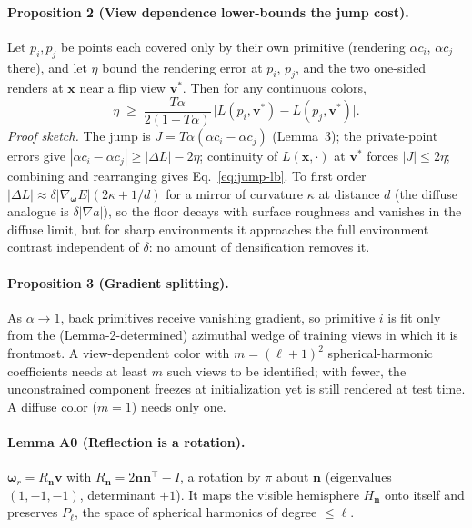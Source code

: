 \paragraph{Proposition 2 (View dependence lower-bounds the jump cost).} Let $p_i,p_j$ be points
each covered only by their own primitive (rendering $\alpha c_i$, $\alpha c_j$ there), and let $\eta$
bound the rendering error at $p_i$, $p_j$, and the two one-sided renders at $\mathbf{x}$ near a
flip view $\mathbf{v}^*$. Then for any continuous colors,
\begin{equation}
\eta \;\ge\; \frac{T\alpha}{2(1+T\alpha)}\,\big|L(p_i,\mathbf{v}^*)-L(p_j,\mathbf{v}^*)\big|.
\label{eq:jump-lb}
\end{equation}
\emph{Proof sketch.} The jump is $J=T\alpha(\alpha c_i-\alpha c_j)$ (Lemma~3); the private-point
errors give $|\alpha c_i-\alpha c_j|\ge|\Delta L|-2\eta$; continuity of $L(\mathbf{x},\cdot)$ at
$\mathbf{v}^*$ forces $|J|\le 2\eta$; combining and rearranging gives Eq.~\eqref{eq:jump-lb}. To first
order $|\Delta L|\approx \delta|\nabla_{\boldsymbol{\omega}} E|(2\kappa+1/d)$ for a mirror of
curvature $\kappa$ at distance $d$ (the diffuse analogue is $\delta|\nabla a|$), so the floor decays
with surface roughness and vanishes in the diffuse limit, but for sharp environments it approaches
the full environment contrast independent of $\delta$: no amount of densification removes it.

\paragraph{Proposition 3 (Gradient splitting).} As $\alpha\to1$, back primitives receive vanishing
gradient, so primitive $i$ is fit only from the (Lemma-2-determined) azimuthal wedge of training
views in which it is frontmost. A view-dependent color with $m=(\ell+1)^2$ spherical-harmonic
coefficients needs at least $m$ such views to be identified; with fewer, the unconstrained component
freezes at initialization yet is still rendered at test time. A diffuse color ($m=1$) needs only
one.

\paragraph{Lemma A0 (Reflection is a rotation).} $\boldsymbol{\omega}_r=R_\mathbf{n}\mathbf{v}$ with
$R_\mathbf{n}=2\mathbf{n}\mathbf{n}^\top-I$, a rotation by $\pi$ about $\mathbf{n}$ (eigenvalues
$(1,-1,-1)$, determinant $+1$). It maps the visible hemisphere $H_\mathbf{n}$ onto itself and
preserves $P_\ell$, the space of spherical harmonics of degree $\le\ell$.


